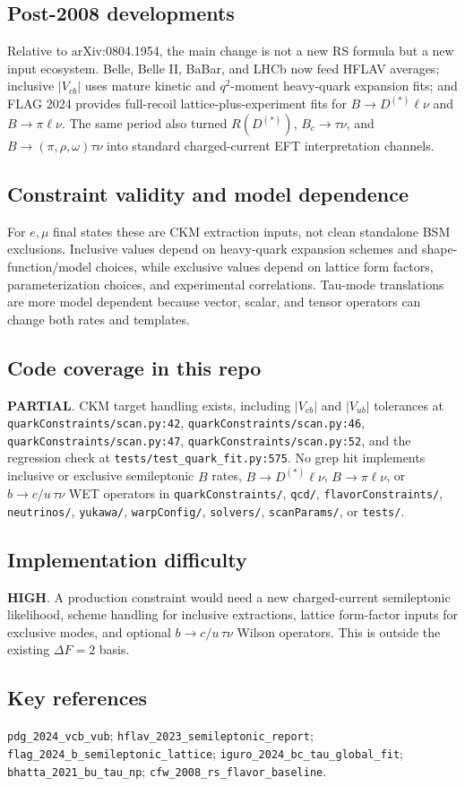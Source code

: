 \subsection*{Post-2008 developments}
Relative to arXiv:0804.1954, the main change is not a new RS formula but a
new input ecosystem.  Belle, Belle II, BaBar, and LHCb now feed HFLAV averages;
inclusive \(|V_{cb}|\) uses mature kinetic and \(q^2\)-moment heavy-quark
expansion fits; and FLAG 2024 provides full-recoil lattice-plus-experiment
fits for \(B\to D^{(*)}\ell\nu\) and \(B\to\pi\ell\nu\).  The same period also
turned \(R(D^{(*)})\), \(B_c\to\tau\nu\), and \(B\to(\pi,\rho,\omega)\tau\nu\)
into standard charged-current EFT interpretation channels.

\subsection*{Constraint validity and model dependence}
For \(e,\mu\) final states these are CKM extraction inputs, not clean
standalone BSM exclusions.  Inclusive values depend on heavy-quark expansion
schemes and shape-function/model choices, while exclusive values depend on
lattice form factors, parameterization choices, and experimental correlations.
Tau-mode translations are more model dependent because vector, scalar, and
tensor operators can change both rates and templates.

\subsection*{Code coverage in this repo}
\textbf{PARTIAL}.  CKM target handling exists, including \(|V_{cb}|\) and
\(|V_{ub}|\) tolerances at \texttt{quarkConstraints/scan.py:42},
\texttt{quarkConstraints/scan.py:46}, \texttt{quarkConstraints/scan.py:47},
\texttt{quarkConstraints/scan.py:52}, and the regression check at
\texttt{tests/test\_quark\_fit.py:575}.  No grep hit implements inclusive or
exclusive semileptonic \(B\) rates, \(B\to D^{(*)}\ell\nu\),
\(B\to\pi\ell\nu\), or \(b\to c/u\,\tau\nu\) WET operators in
\texttt{quarkConstraints/}, \texttt{qcd/}, \texttt{flavorConstraints/},
\texttt{neutrinos/}, \texttt{yukawa/}, \texttt{warpConfig/},
\texttt{solvers/}, \texttt{scanParams/}, or \texttt{tests/}.

\subsection*{Implementation difficulty}
\textbf{HIGH}.  A production constraint would need a new charged-current
semileptonic likelihood, scheme handling for inclusive extractions, lattice
form-factor inputs for exclusive modes, and optional \(b\to c/u\,\tau\nu\)
Wilson operators.  This is outside the existing \(\Delta F=2\) basis.

\subsection*{Key references}
\texttt{pdg\_2024\_vcb\_vub};
\texttt{hflav\_2023\_semileptonic\_report};
\texttt{flag\_2024\_b\_semileptonic\_lattice};
\texttt{iguro\_2024\_bc\_tau\_global\_fit};
\texttt{bhatta\_2021\_bu\_tau\_np};
\texttt{cfw\_2008\_rs\_flavor\_baseline}.
